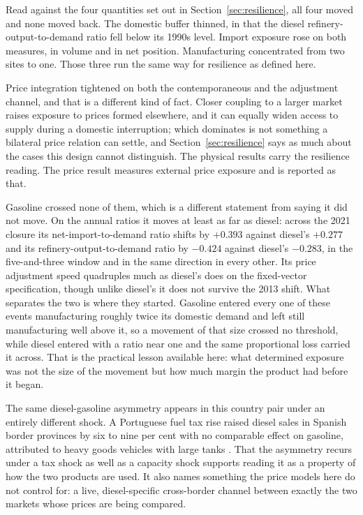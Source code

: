 \documentclass[11pt,a4paper]{article}
\begin{document}
Read against the four quantities set out in Section~\ref{sec:resilience}, all four moved and
none moved back. The domestic buffer thinned, in that the diesel refinery-output-to-demand ratio
fell below its 1990s level. Import exposure rose on both measures, in volume and in net
position. Manufacturing concentrated from two sites to one. Those three run the same way for
resilience as defined here.

Price integration tightened on both the contemporaneous and the adjustment channel, and that is
a different kind of fact. Closer coupling to a larger market raises exposure to prices formed
elsewhere, and it can equally widen access to supply during a domestic interruption; which
dominates is not something a bilateral price relation can settle, and Section~\ref{sec:resilience}
says as much about the cases this design cannot distinguish. The physical results carry the
resilience reading. The price result measures external price exposure and is reported as that.

Gasoline crossed none of them, which is a different statement from saying it did not move. On
the annual ratios it moves at least as far as diesel: across the 2021 closure its net-import-to-demand
ratio shifts by $+0.393$ against diesel's $+0.277$ and its refinery-output-to-demand
ratio by $-0.424$ against diesel's $-0.283$, in the five-and-three window and in the same
direction in every other. Its price adjustment speed quadruples much as diesel's does on the fixed-vector specification, though unlike diesel's it does not survive the 2013 shift. What
separates the two is where they started. Gasoline entered every one of these events
manufacturing roughly twice its domestic demand and left still manufacturing well above it, so a
movement of that size crossed no threshold, while diesel entered with a ratio near one and the
same proportional loss carried it across. That is the practical lesson available here: what
determined exposure was not the size of the movement but how much margin the product had before
it began.

The same diesel-gasoline asymmetry appears in this country pair under an entirely different
shock. A Portuguese fuel tax rise raised diesel sales in Spanish border provinces by six to nine
per cent with no comparable effect on gasoline, attributed to heavy goods vehicles with large
tanks \citep{teixido2024carbon}. That the asymmetry recurs under a tax shock as well as a
capacity shock supports reading it as a property of how the two products are used. It also names
something the price models here do not control for: a live, diesel-specific cross-border channel
between exactly the two markets whose prices are being compared.
\end{document}
